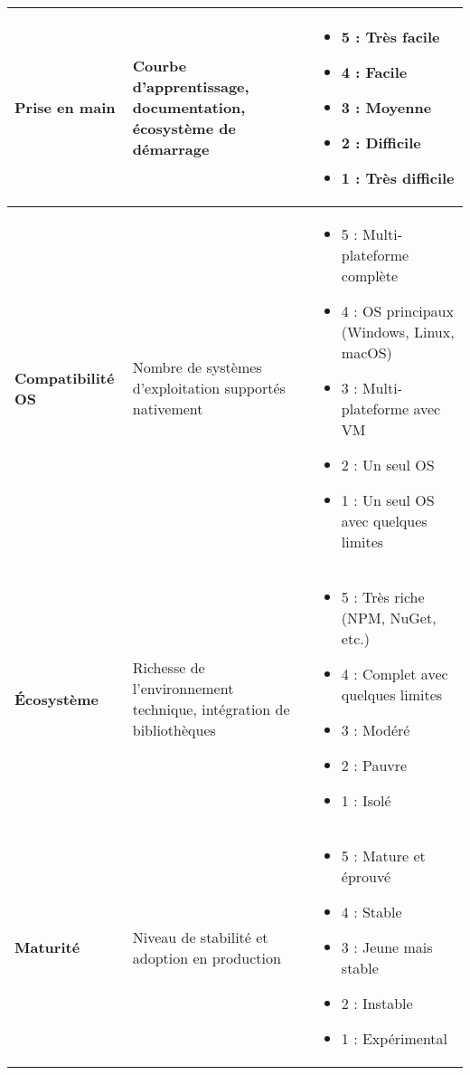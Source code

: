 \begin{longtable}{|p{}|p{}|p{}|}
\textbf{Prise en main} & Courbe d’apprentissage, documentation, écosystème de démarrage & 
\begin{itemize}
    \item 5 : Très facile
    \item 4 : Facile
    \item 3 : Moyenne
    \item 2 : Difficile
    \item 1 : Très difficile
\end{itemize} \\
\hline

\textbf{Compatibilité OS} & Nombre de systèmes d’exploitation supportés nativement & 
\begin{itemize}
    \item 5 : Multi-plateforme complète
    \item 4 : OS principaux (Windows, Linux, macOS)
    \item 3 : Multi-plateforme avec VM
    \item 2 : Un seul OS
    \item 1 : Un seul OS avec quelques limites
\end{itemize} \\
\hline

\textbf{Écosystème} & Richesse de l’environnement technique, intégration de bibliothèques & 
\begin{itemize}
    \item 5 : Très riche (NPM, NuGet, etc.)
    \item 4 : Complet avec quelques limites
    \item 3 : Modéré
    \item 2 : Pauvre
    \item 1 : Isolé
\end{itemize} \\
\hline

\textbf{Maturité} & Niveau de stabilité et adoption en production & 
\begin{itemize}
    \item 5 : Mature et éprouvé
    \item 4 : Stable
    \item 3 : Jeune mais stable
    \item 2 : Instable
    \item 1 : Expérimental
\end{itemize} \\
\hline
\end{longtable}
